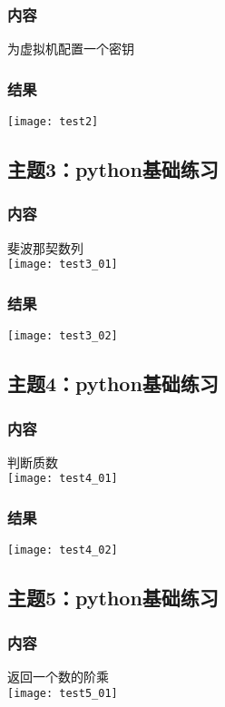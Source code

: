 \documentclass{article}
\begin{document}
\subsubsection{内容}
为虚拟机配置一个密钥\\
\subsubsection{结果}  
\texttt{[image: test2]}\\
\vspace{1cm}
\subsection{主题3：python基础练习}  
\subsubsection{内容}
斐波那契数列\\
\texttt{[image: test3\_01]}\\
\subsubsection{结果}  
\texttt{[image: test3\_02]}\\
\vspace{1cm}
\subsection{主题4：python基础练习}  
\subsubsection{内容}
判断质数\\
\texttt{[image: test4\_01]}\\
\subsubsection{结果}  
\texttt{[image: test4\_02]}\\
\vspace{1cm}
\subsection{主题5：python基础练习}  
\subsubsection{内容}
返回一个数的阶乘\\
\texttt{[image: test5\_01]}\\
\end{document}
